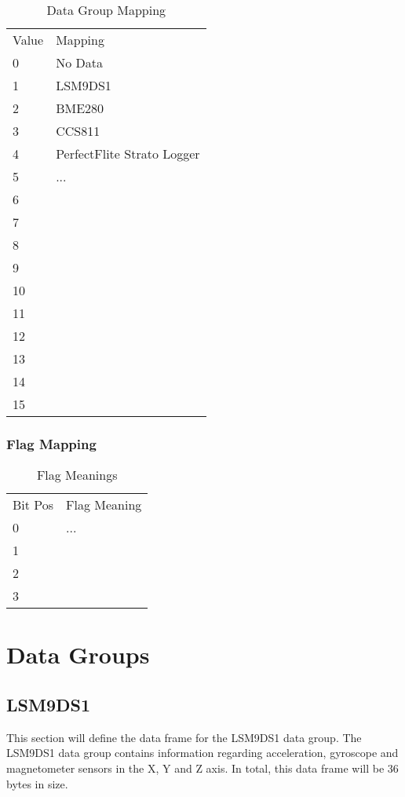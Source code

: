 \documentclass{article}
\begin{document}
  \begin{table}[h]
  \centering
  \caption{Data Group Mapping}
  \begin{tabular}{ll}
  Value & Mapping \\
  0     & No Data \\
  1     & LSM9DS1     \\
  2     & BME280        \\
  3     & CCS811        \\
  4     & PerfectFlite Strato Logger       \\
  5     & ...        \\
  6     &         \\
  7     &         \\
  8     &         \\
  9     &         \\
  10    &         \\
  11    &         \\
  12    &         \\
  13    &         \\
  14    &         \\
  15    &        
  \end{tabular}
  \end{table}

  \subsubsection{Flag Mapping}
  
  \begin{table}[H]
  \centering
  \caption{Flag Meanings}
  \begin{tabular}{ll}
  Bit Pos & Flag Meaning \\
  0       & ...          \\
  1       &              \\
  2       &              \\
  3       &             
  \end{tabular}
  \end{table}
  
  \section{Data Groups}
  \subsection{LSM9DS1}
  This section will define the data frame for the LSM9DS1 data group. The LSM9DS1 data group contains information regarding acceleration, gyroscope and magnetometer sensors in the X, Y and Z axis. In total, this data frame will be 36 bytes in size. 
\end{document}
